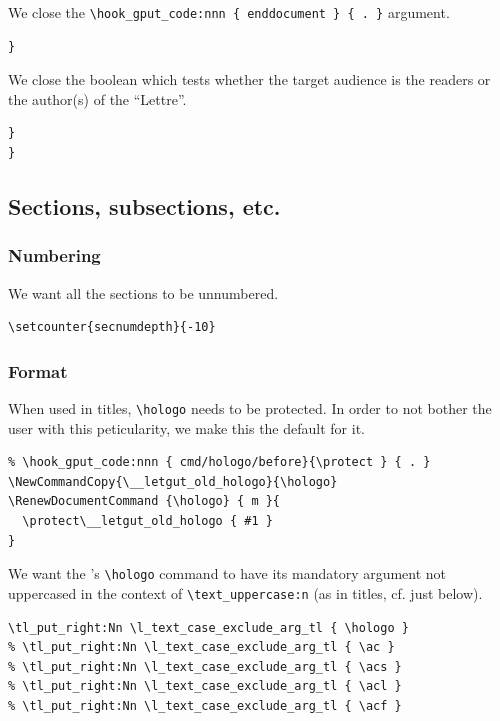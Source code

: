 \documentclass{letgut}
\begin{document}
We close the \lstinline+\hook_gput_code:nnn { enddocument } { . }+ argument.

\begin{lstlisting}
}
\end{lstlisting}

We close the boolean which tests whether the target audience is the readers or
the author(s) of the “Lettre”.

\begin{lstlisting}
}
}
\end{lstlisting}
\subsection{Sections, subsections, etc.}
\label{ImplementationSectionssubsectionsetc-vzng55h0jlj0}
\subsubsection{Numbering}
\label{ImplementationSectionssubsectionsetcNumbering-lmog55h0jlj0}
We want all the sections to be unnumbered.

\begin{lstlisting}
\setcounter{secnumdepth}{-10}
\end{lstlisting}
\subsubsection{Format}
\label{ImplementationSectionssubsectionsetcFormat-tapg55h0jlj0}
When used in titles, \lstinline+\hologo+ needs to be protected. In order to not bother the
user with this peticularity, we make this the default for it.

\begin{lstlisting}
% \hook_gput_code:nnn { cmd/hologo/before}{\protect } { . }
\NewCommandCopy{\__letgut_old_hologo}{\hologo}
\RenewDocumentCommand {\hologo} { m }{
  \protect\__letgut_old_hologo { #1 }
}
\end{lstlisting}

We want the 's \lstinline+\hologo+ command to have its mandatory argument
not uppercased in the context of \lstinline+\text_uppercase:n+ (as in titles, cf. just
below).

\begin{lstlisting}
\tl_put_right:Nn \l_text_case_exclude_arg_tl { \hologo }
% \tl_put_right:Nn \l_text_case_exclude_arg_tl { \ac }
% \tl_put_right:Nn \l_text_case_exclude_arg_tl { \acs }
% \tl_put_right:Nn \l_text_case_exclude_arg_tl { \acl }
% \tl_put_right:Nn \l_text_case_exclude_arg_tl { \acf }
\end{lstlisting}
\end{document}
